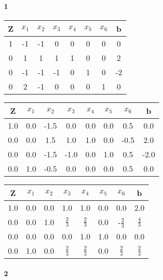 \paragraph{1}

\begin{center}
	\begin{tabular}{|c|c|c|c|c|c|c|c|}
		\hline
		Z & $x_1$ & $x_2$ & $x_3$ & $x_4$ & $x_5$ & $x_6$ & b\\
		\hline
		1 & -1 & -1 & 0 & 0 & 0 & 0 & 0\\
		0 & 1 & 1 & 1 & 1 & 0 & 0 & 2\\
		0 & -1 & -1 & -1 & 0 & 1 & 0 & -2\\
		0 & 2 & -1 & 0 & 0 & 0 & 1 & 0\\
		\hline
	\end{tabular}
\end{center}
\begin{center}
	\begin{tabular}{|c|c|c|c|c|c|c|c|}
		\hline
		Z & $x_1$ & $x_2$ & $x_3$ & $x_4$ & $x_5$ & $x_6$ & b\\
		\hline
		1.0 & 0.0 & -1.5 & 0.0 & 0.0 & 0.0 & 0.5 & 0.0\\
		0.0 & 0.0 & 1.5 & 1.0 & 1.0 & 0.0 & -0.5 & 2.0\\
		0.0 & 0.0 & -1.5 & -1.0 & 0.0 & 1.0 & 0.5 & -2.0\\
		0.0 & 1.0 & -0.5 & 0.0 & 0.0 & 0.0 & 0.5 & 0.0\\
		\hline
	\end{tabular}
\end{center}
\begin{center}
	\begin{tabular}{|c|c|c|c|c|c|c|c|}
		\hline
		Z & $x_1$ & $x_2$ & $x_3$ & $x_4$ & $x_5$ & $x_6$ & b\\
		\hline
		1.0 & 0.0 & 0.0 & 1.0 & 1.0 & 0.0 & 0.0 & 2.0\\
		0.0 & 0.0 & 1.0 & $\frac 2 3$ & $\frac 2 3$ & 0.0 & -$\frac 2 3$ & $\frac 4 3$\\
		0.0 & 0.0 & 0.0 & 0.0 & 1.0 & 1.0 & 0.0 & 0.0\\
		0.0 & 1.0 & 0.0 & $\frac 2 3$ & $\frac 2 3$ & 0.0 & $\frac 2 3$ & $\frac 2 3$\\
		\hline
	\end{tabular}
\end{center}

\paragraph{2}

